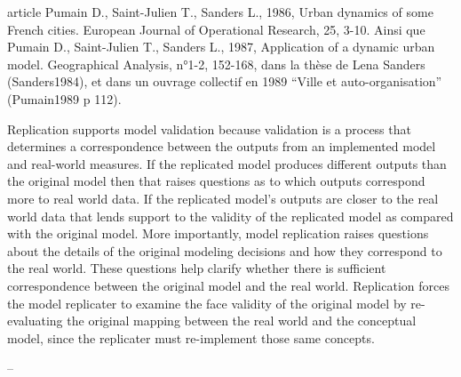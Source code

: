






article Pumain D., Saint-Julien T., Sanders L., 1986, Urban dynamics of some French cities. European Journal of Operational Research, 25, 3-10. Ainsi que Pumain D., Saint-Julien T., Sanders L., 1987, Application of a dynamic urban model. Geographical Analysis, n°1-2, 152-168, dans la thèse de Lena Sanders (Sanders1984), et dans un ouvrage collectif en 1989 “Ville et auto-organisation” (Pumain1989 p 112).


Replication supports model validation because validation is a process that determines a correspondence between the outputs from an implemented model and real-world measures. If the replicated model produces different outputs than the original model then that raises questions as to which outputs correspond more to real world data. If the replicated model's outputs are closer to the real world data that lends support to the validity of the replicated model as compared with the original model. More importantly, model replication raises questions about the details of the original modeling decisions and how they correspond to the real world. These questions help clarify whether there is sufficient correspondence between the original model and the real world. Replication forces the model replicater to examine the face validity of the original model by re-evaluating the original mapping between the real world and the conceptual model, since the replicater must re-implement those same concepts.

--



